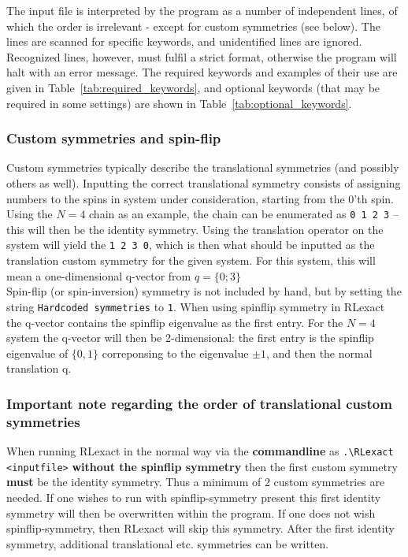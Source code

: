 \documentclass{article}
\begin{document}
The input file is interpreted by the program as a number of independent lines, of which the order is irrelevant - except for custom symmetries (see below). The lines are scanned for specific keywords, and unidentified lines are ignored. Recognized lines, however, must fulfil a strict format, otherwise the program will halt with an error message. 
The required keywords and examples of their use are given in Table~\ref{tab:required_keywords}, and optional keywords 
(that may be required in some settings) are shown in Table~\ref{tab:optional_keywords}.\\

\subsubsection{Custom symmetries and spin-flip}
Custom symmetries typically describe the translational symmetries (and possibly others as well). Inputting the correct translational symmetry consists of assigning numbers to the spins in system under consideration, starting from the 0'th spin. Using the $N=4$ chain as an example, the chain can be enumerated as \texttt{0 1 2 3} -- this will then be the identity symmetry. Using the translation operator on the system will yield the \texttt{1 2 3 0}, which is then what should be inputted as the translation custom symmetry for the given system. For this system, this will mean a one-dimensional q-vector from $q=\{0;3\}$\\

Spin-flip (or spin-inversion) symmetry is not included by hand, but by setting the string \texttt{Hardcoded symmetries} to \texttt{1}. When using spinflip symmetry in RLexact the q-vector contains the spinflip eigenvalue as the first entry. For the $N=4$ system the q-vector will then be 2-dimensional: the first entry is the spinflip eigenvalue of $\{0,1\}$ correponsing to the eigenvalue $\pm 1$, and then the normal translation q. 

\subsubsection{Important note regarding the order of translational custom symmetries}
When running RLexact in the normal way via the \textbf{commandline} as \texttt{.\textbackslash RLexact <inputfile>} \textbf{without the spinflip symmetry }then the first custom symmetry \textbf{must} be the identity symmetry. Thus a minimum of 2 custom symmetries are needed. If one wishes to run with spinflip-symmetry present this first identity symmetry will then be overwritten within the program. If one does not wish spinflip-symmetry, then RLexact will skip this symmetry. After the first identity symmetry, additional translational etc. symmetries can be written.\\
\end{document}
